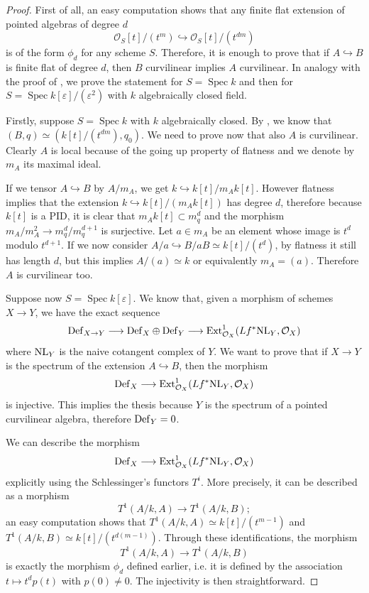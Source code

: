 \documentclass{alggeom}
\numberwithin{equation}{section}
\numberwithin{subsection}{section}
\theoremstyle{definition}
\theoremstyle{remark}
\newcommand\cO{\mathcal{O}} \newcommand\cP{\mathcal{P}}
\newcommand\into{\hookrightarrow}
\newcommand\ext{\operatorname{Ext}}
\newcommand\spec{\operatorname{Spec}}
\renewcommand{\epsilon}{\varepsilon}
\begin{document}
\begin{proof}
	First of all, an easy computation shows that any finite flat extension of pointed algebras of degree $d$ $$\cO_{S}[t]/(t^{m})\into \cO_{S}[t]/(t^{dm})$$ 
	is of the form $\phi_d$ for any scheme $S$. Therefore, it is enough to prove that if $A\into B$ is finite flat of degree $d$, then $B$ curvilinear implies $A$ curvilinear. In analogy with the proof of , we prove the statement for $S=\spec k$ and then for $S=\spec k[\epsilon]/(\epsilon^2)$ with $k$ algebraically closed field.
	
	Firstly, suppose $S=\spec k$ with $k$ algebraically closed. By , we know that $(B,q)\simeq (k[t]/(t^{dm}),q_0)$. We need to prove now that also $A$ is curvilinear. Clearly $A$ is local because of the going up property of flatness and we denote by $m_A$ its maximal ideal. 
	
	If we tensor $A\into B$ by $A/m_A$, we get $k\into k[t]/m_Ak[t]$. However flatness implies that the extension $k\into k[t]/(m_Ak[t])$ has degree $d$, therefore because $k[t]$ is a PID, it is clear that $m_Ak[t]\subset m_q^{d}$ and the morphism $m_A/m_A^2\rightarrow m_q^d/m_q^{d+1}$ is surjective. Let $a \in m_A$ be an element whose image is $t^d$ modulo $t^{d+1}$. If we now consider $A/a\into B/aB\simeq k[t]/(t^d)$, by flatness it still has length $d$, but this implies $A/(a)\simeq k$ or equivalently $m_A=(a)$. Therefore $A$ is curvilinear too. 
	
	Suppose now $S=\spec k[\epsilon]$.
	We know that, given a morphism of schemes $X\rightarrow Y$, we have the exact sequence
	$$ {\rm Def}_{X\rightarrow Y} \longrightarrow {\rm Def}_X \oplus {\rm Def}_Y \longrightarrow \ext^1_{\cO_X}(Lf^*{\rm NL}_Y,\cO_X)$$
	where ${\rm NL}_Y$ is the naive cotangent complex of $Y$. We want to prove that if $X\rightarrow Y$ is the spectrum of the extension $A\into B$,  then the morphism 
	$$ {\rm Def}_X \longrightarrow \ext^1_{\cO_X}(Lf^*{\rm NL}_Y,\cO_X)$$ 
	is injective. This implies the thesis because $Y$ is the spectrum of a pointed curvilinear algebra, therefore ${\rm Def}_Y=0$. 
	
	
	We can describe the morphism
	$$
	{\rm Def}_X \longrightarrow \ext^1_{\cO_X}(Lf^*{\rm NL}_Y,\cO_X)
	$$ explicitly using the Schlessinger's functors $T^i$. More precisely, it can be described as a morphism
	$$T^1(A/k,A)\rightarrow T^1(A/k,B);$$
	an easy computation shows that $T^1(A/k,A)\simeq k[t]/(t^{m-1})$ and $T^1(A/k,B)\simeq k[t]/(t^{d(m-1)})$. Through these identifications, the morphism  $$T^1(A/k,A)\rightarrow T^1(A/k,B)$$ is exactly the morphism $\phi_d$ defined earlier, i.e. it is defined by the association $t\mapsto t^dp(t)$ with $p(0)\neq 0$. The injectivity is then straightforward.
\end{proof}
\end{document}
